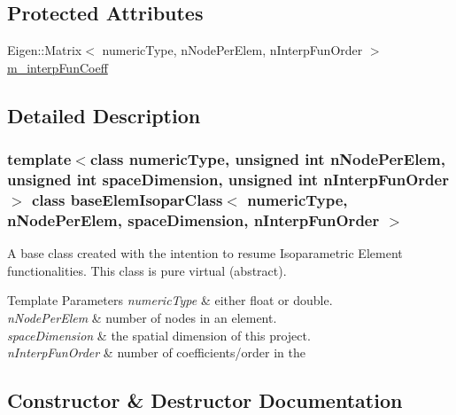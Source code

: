 \subsection*{Protected Attributes}
\begin{DoxyCompactItemize}
\item 
Eigen\+::\+Matrix$<$ numeric\+Type, n\+Node\+Per\+Elem, n\+Interp\+Fun\+Order $>$ \mbox{\hyperlink{classbase_elem_isopar_class_a0f1b22b54347906b42755bb331879a5d}{m\+\_\+interp\+Fun\+Coeff}}
\end{DoxyCompactItemize}


\subsection{Detailed Description}
\subsubsection*{template$<$class numeric\+Type, unsigned int n\+Node\+Per\+Elem, unsigned int space\+Dimension, unsigned int n\+Interp\+Fun\+Order$>$\newline
class base\+Elem\+Isopar\+Class$<$ numeric\+Type, n\+Node\+Per\+Elem, space\+Dimension, n\+Interp\+Fun\+Order $>$}

A base class created with the intention to resume Isoparametric Element functionalities. This class is pure virtual (abstract). 


\begin{DoxyTemplParams}{Template Parameters}
{\em numeric\+Type} & either float or double. \\
\hline
{\em n\+Node\+Per\+Elem} & number of nodes in an element. \\
\hline
{\em space\+Dimension} & the spatial dimension of this project. \\
\hline
{\em n\+Interp\+Fun\+Order} & number of coefficients/order in the \\
\hline
\end{DoxyTemplParams}


\subsection{Constructor \& Destructor Documentation}
\mbox{\label{classbase_elem_isopar_class_a398bc04e9d2f5468b2635fcf616651bc}} 
